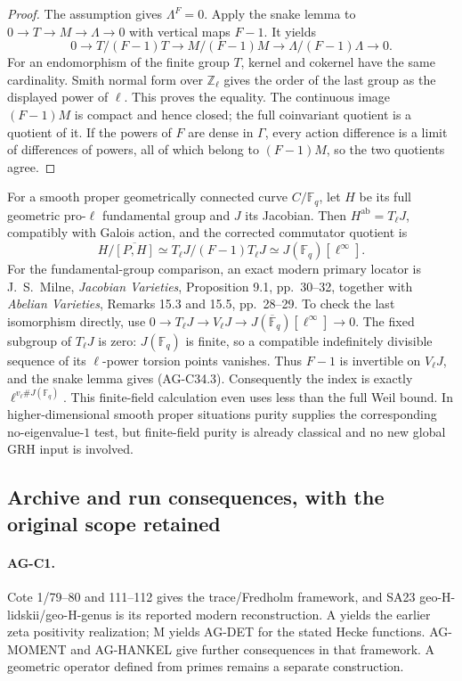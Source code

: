 \begin{proof}
The assumption gives $\Lambda^F=0$. Apply the snake lemma to
$0\to T\to M\to\Lambda\to0$ with vertical maps $F-1$.
It yields
\[
 0\longrightarrow T/(F-1)T\longrightarrow M/(F-1)M
 \longrightarrow\Lambda/(F-1)\Lambda\longrightarrow0.
\]
For an endomorphism of the finite group $T$, kernel and cokernel have
the same cardinality. Smith normal form over $\mathbb Z_\ell$ gives
the order of the last group as the displayed power of $\ell$.
This proves the equality. The continuous image $(F-1)M$ is compact
and hence closed; the full coinvariant quotient is a quotient of it.
If the powers of $F$ are dense in $\Gamma$, every action difference
is a limit of differences of powers, all of which belong to
$(F-1)M$, so the two quotients agree.
\end{proof}

For a smooth proper geometrically connected curve $C/\mathbb F_q$,
let $H$ be its full geometric pro-$\ell$ fundamental group and $J$ its
Jacobian. Then $H^{\mathrm{ab}}=T_\ell J$, compatibly with Galois
action, and the corrected commutator quotient is
\[
 H/\overline{[P,H]}
       \simeq T_\ell J/(F-1)T_\ell J
       \simeq J(\mathbb F_q)[\ell^\infty].             \tag{AG-C34.3}
\]
For the fundamental-group comparison, an exact modern primary locator
is J.~S.~Milne, \emph{Jacobian Varieties}, Proposition 9.1,
pp.~30--32, together with \emph{Abelian Varieties}, Remarks 15.3
and 15.5, pp.~28--29. To check the last isomorphism directly, use
$0\to T_\ell J\to V_\ell J\to J(\overline{\mathbb F}_q)
[\ell^\infty]\to0$. The fixed subgroup of $T_\ell J$ is zero:
$J(\mathbb F_q)$ is finite, so a compatible indefinitely divisible
sequence of its $\ell$-power torsion points vanishes. Thus $F-1$ is
invertible on $V_\ell J$, and the snake lemma gives (AG-C34.3).
Consequently the index is exactly $\ell^{v_\ell\#J(\mathbb F_q)}$.
This finite-field calculation even uses less than the full Weil bound.
In higher-dimensional smooth proper situations purity supplies the
corresponding no-eigenvalue-$1$ test, but finite-field purity is already
classical and no new global GRH input is involved.

\subsection{Archive and run consequences, with the original scope retained}
\label{ag:archive}

\paragraph{AG-C1.} Cote 1/79--80 and 111--112 gives the trace/Fredholm
framework, and SA23 geo-H-lidskii/geo-H-genus is its reported modern
reconstruction. A yields the earlier zeta positivity realization;
M yields AG-DET for the stated Hecke functions. AG-MOMENT and AG-HANKEL
give further consequences in that framework. A geometric operator defined
from primes remains a separate construction.

